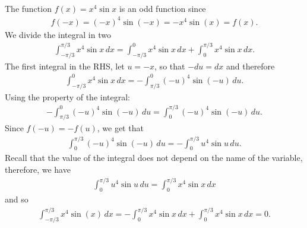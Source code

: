 	\\
	The function $f(x) = x^4 \sin x$ is an odd function since
		\begin{align*}
		f(-x) = (-x)^4 \sin (-x) = - x^4 \sin (x) = f(x) .
		\end{align*}
	We divide the integral in two
		\begin{align*}
		\int_{-\pi/3}^{\pi/3} x^4 \sin x \, dx = \int_{-\pi/3}^0 x^4 \sin x \, dx + \int_0^{\pi/3} x^4 \sin x \, dx .
		\end{align*}
	The first integral in the RHS, let $u = -x$, so that $-du = dx$ and therefore
		\begin{align*}
		\int_{-\pi/3}^0 x^4 \sin x \, dx = -\int_{\pi/3}^0 (-u)^4 \sin (-u) \, du .
		\end{align*}
	Using the property of the integral:
		\begin{align*}
		-\int_{\pi/3}^0 (-u)^4 \sin (-u) \, du = \int_{0}^{\pi/3} (-u)^4 \sin (-u) \, du .
		\end{align*}
	Since $f(-u) = -f(u)$, we get that
		\begin{align*}
		\int_0^{\pi/3} (-u)^4 \sin (-u) \, du = -\int_0^{\pi/3} u^4 \sin u \, du .
		\end{align*}
	Recall that the value of the integral does not depend on the name of the variable, therefore, we have
		\begin{align*}
		\int_0^{\pi/3} u^4 \sin u \, du = \int_0^{\pi/3} x^4 \sin x \, dx 
		\end{align*}
	and so
		\begin{align*}
		\int_{-\pi/3}^{\pi/3} x^4 \sin (x) \, dx = -\int_0^{\pi/3} x^4 \sin x \, dx + \int_0^{\pi/3} x^4 \sin x \, dx = 0 .
		\end{align*}
		
